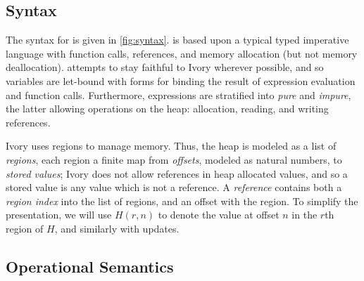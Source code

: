 
\subsection{Syntax}


The syntax for \coreivory{} is given in \autoref{fig:syntax}.
\coreivory{} is based upon a typical typed imperative language with
function calls, references, and memory allocation (but not memory
deallocation).  \coreivory{} attempts to stay faithful to Ivory
wherever possible, and so variables are let-bound with forms for
binding the result of expression evaluation and function
calls. Furthermore, \coreivory{} expressions are stratified into
\emph{pure} and \emph{impure}, the latter allowing operations on the
heap: allocation, reading, and writing references.

Ivory uses regions to manage memory.  Thus, the heap is modeled as a
list of \emph{regions}, each region a finite map from \emph{offsets},
modeled as natural numbers, to \emph{stored values}; Ivory does not
allow references in heap allocated values, and so a stored value is
any value which is not a reference. A \emph{reference} contains both a
\emph{region index} into the list of regions, and an offset with the
region.  To simplify the presentation, we will use $H(r, n)$ to denote
the value at offset $n$ in the $r$th region of $H$, and similarly with
updates.

\subsection{Operational Semantics}


\newcommand{\stepsX}[2]{\models #1 \longmapsto{} #2}
\newcommand{\steps}[4]{\stepsX{#1; #2}{#3; #4}}

\newcommand{\denoteexp}[2]{\llbracket{}#1\rrbracket{}#2}

\newcommand{\stepsH}[2]{#1 \longmapsto_I #2}
\newcommand{\hsteps}[5]{#1 \models \stepsH{#2; #3}{#4; #5}}

\newcommand{\wfstmt}[5]{#1; #2; #3 \vdash_s #4 : #5}
\newcommand{\wfexp}[3]{#1 \vdash_e #2 : #3}
\newcommand{\wfimp}[4]{#1; #2 \vdash_i #3 : #4}

